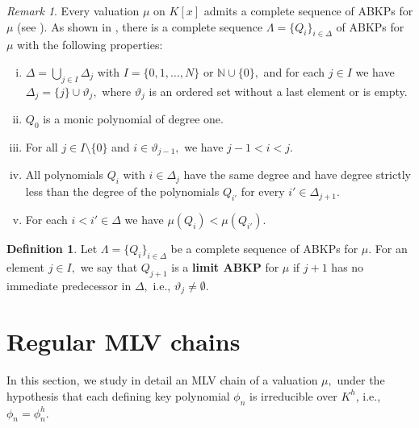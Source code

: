 \documentclass[11pt]{amsart}
\theoremstyle{definition}
\newtheorem{definition}[theorem]{Definition}
\theoremstyle{remark}
\newtheorem{remark}[theorem]{Remark}
\numberwithin{equation}{section}
\begin{document}
 			
 			\begin{remark}\label{rabkp}
 				Every valuation $\mu$ on $K[x]$ admits a complete sequence of ABKPs for $\mu$ (see \cite[Theorem 1.1]{NS}). As shown in \cite[Remark 4.6]{W}, there is a complete sequence  $\Lambda=\{Q_i\}_{i\in\Delta}$ of ABKPs  for  $\mu$ with the following properties:
 				\begin{enumerate}[(i)]
 					\item $\Delta=\bigcup_{j\in I}\Delta_j$ with $I=\{0,1,\ldots, N\}$ or $\mathbb{N}\cup\{0\},$ and for each $j\in I$ we have $\Delta_j=\{j\}\cup\vartheta_{j},$ where $\vartheta_j$ is an ordered set without a last element or is empty.
 					\item $Q_0$ is a monic polynomial of degree one.
 					\item For all $j\in I\setminus \{0\}$ and $i \in\vartheta_{j-1},$ we have $j-1<i<j.$ 
 					\item All  polynomials $Q_i$ with $i\in\Delta_j$ have the same degree and  have degree strictly  less than  the degree of the polynomials $Q_{i'}$ for every $i'\in\Delta_{j+1}.$
 					\item For each $i<i'\in\Delta$ we have $\mu(Q_i)<\mu(Q_{i'}).$
 				\end{enumerate}
 			\end{remark}
 			
 			\begin{definition}
 				Let $\Lambda=\{Q_i\}_{i\in\Delta}$ be a complete sequence of ABKPs for $\mu.$	For	an element $j\in I,$ we say that  $Q_{j+1}$ is a {\bf limit ABKP} for $\mu$ if $j+1$ has no immediate predecessor in $\Delta,$ i.e.,	$\vartheta_{j}\neq \emptyset.$\end{definition}
 			
 			 
 \section{Regular MLV chains}
 
 In this section, we study in detail an MLV chain of a valuation $\mu,$ under the hypothesis that each defining key polynomial $\phi_n$ is irreducible over $K^h$, i.e., $\phi_n=\phi_n^h.$
 
\end{document}
